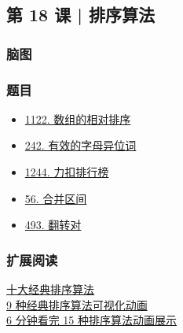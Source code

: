 \subsection{第 18 课 | 排序算法}

\subsubsection{脑图}

\subsubsection{题目}

\begin{itemize}
  \item \hyperref[leetcode:1122]{1122. 数组的相对排序}
  \item \hyperref[leetcode:242]{242. 有效的字母异位词}
  \item \hyperref[leetcode:1244]{1244. 力扣排行榜}
  \item \hyperref[leetcode:56]{56. 合并区间}
  \item \hyperref[leetcode:493]{493. 翻转对}
\end{itemize}

\subsubsection{扩展阅读}

\href{https://www.cnblogs.com/onepixel/p/7674659.html}{十大经典排序算法} \\
\href{https://www.bilibili.com/video/av25136272}{9 种经典排序算法可视化动画} \\
\href{https://www.bilibili.com/video/av63851336}{6 分钟看完 15 种排序算法动画展示}
